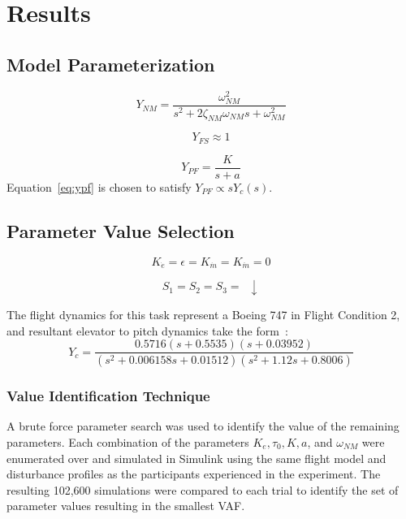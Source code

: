 \section{Results}


\subsection{Model Parameterization}
\begin{equation}
    Y_{NM} = \frac{\omega^2_{NM}}{s^2 + 2 \zeta_{NM} \omega_{NM} s + \omega^2_{NM}}
\end{equation}

\begin{equation}
    Y_{FS} \approx 1
\end{equation}

\begin{equation} \label{eq:ypf}
    Y_{PF} = \frac{K}{s+a}
\end{equation}
Equation~\ref{eq:ypf} is chosen to satisfy $Y_{PF} \propto s Y_c (s)$.

\subsection{Parameter Value Selection}

\begin{equation}
    K_{\dot{e}} = \epsilon = K_{\dot{m}} = K_{\ddot{m}} = 0
\end{equation}

\begin{equation}
    S_1 = S_2 = S_3 = \enspace \downarrow
\end{equation}


The flight dynamics for this task represent a Boeing 747 in Flight Condition 2, and resultant elevator to pitch dynamics take the form~\citep{heffley1972aircraft}:
\begin{equation}
    Y_c = \frac{0.5716 (s+0.5535) (s+0.03952)}{(s^2 + 0.006158s + 0.01512) (s^2 + 1.12s + 0.8006)}
\end{equation}

\subsubsection{Value Identification Technique}
A brute force parameter search was used to identify the value of the remaining parameters.
Each combination of the parameters $K_e, \tau_0, K, a$, and $\omega_{NM}$ were enumerated over and simulated in Simulink using the same flight model and disturbance profiles as the participants experienced in the experiment.
The resulting 102,600 simulations were compared to each trial to identify the set of parameter values resulting in the smallest VAF.

